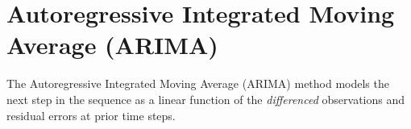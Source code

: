 %
%
%
%
%
%
%

\section{Autoregressive Integrated Moving Average
(ARIMA)}\label{autoregressive-integrated-moving-average-arima}

The Autoregressive Integrated Moving Average (ARIMA) method models the
next step in the sequence as a linear function of the \emph{differenced}
observations and residual errors at prior time steps.

